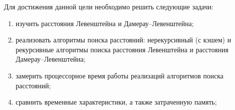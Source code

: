 Для достижения данной цели необходимо решить следующие задачи:

\begin{enumerate}
	\item изучить расстояния Левенштейна и Дамерау--Левенштейна;
	\item реализовать алгоритмы поиска расстояний: нерекурсивный (с кэшем) и рекурсивные алгоритмы поиска расстояния Левенштейна и расстояния Дамерау--Левенштейна;
	\item замерить процессорное время работы реализаций алгоритмов поиска расстояний;
	\item сравнить временные характеристики, а также затраченную память;
\end{enumerate}
